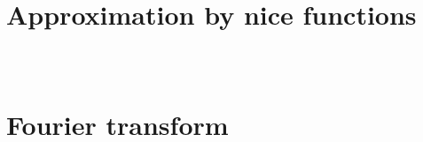 \documentclass{beamer}
\numberwithin{equation}{section}
\begin{document}
\begin{frame}\frametitle{{\normalsize \secname} \\ {\large \subsecname}}
\end{frame}

\begin{frame}\frametitle{{\normalsize \secname} \\ {\large \subsecname}}
\end{frame}

\begin{frame}\frametitle{{\normalsize \secname} \\ {\large \subsecname}}
\end{frame}

\begin{frame}\frametitle{{\normalsize \secname} \\ {\large \subsecname}}
\end{frame}

\begin{frame}\frametitle{{\normalsize \secname} \\ {\large \subsecname}}
\end{frame}

\section{Approximation by nice functions}

\begin{frame}\frametitle{{\normalsize \secname} \\ {\large \subsecname}}
\end{frame}

\section{Fourier transform}

\begin{frame}\frametitle{{\normalsize \secname} \\ {\large \subsecname}}
\end{frame}
\end{document}
